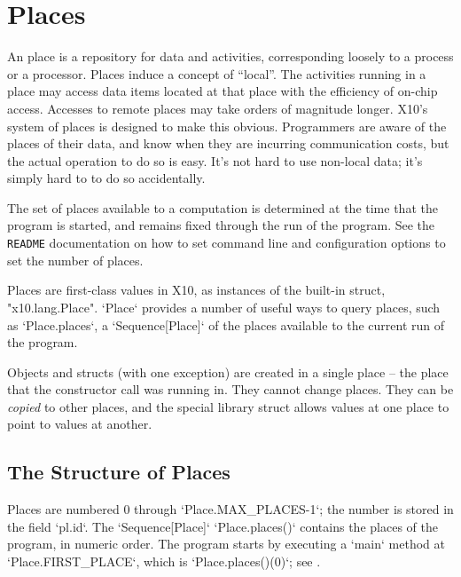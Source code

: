 
\chapter{Places}
\label{XtenPlaces}

An \Xten{} place is a repository for data and activities, corresponding
loosely to a process or a processor. Places induce a concept of ``local''. The
activities running in a place may access data items located at that place with
the efficiency of on-chip access. Accesses to remote places may take orders of
magnitude longer. X10's system of places is designed to make this obvious.
Programmers are aware of the places of their data, and know when they are
incurring communication costs, but the actual operation to do so is easy. It's
not hard to use non-local data; it's simply hard to to do so accidentally.

The set of places available to a computation is determined at the time that
the program is started, and remains fixed through the run of the program. See
the {\tt README} documentation on how to set command line and configuration
options to set the number of places.

Places are first-class values in X10, as instances of the built-in struct,
\xcd"x10.lang.Place".   \xcd`Place` provides a number of useful ways to
query places, such as \xcd`Place.places`, a \xcd`Sequence[Place]` of 
the places
available to the current run of the program.

Objects and structs (with one exception) are created in a single place -- the
place that the constructor call was running in. They cannot change places.
They can be {\em copied} to other places, and the special library struct
 allows values at one place to point to values at another.  

\section{The Structure of Places}

Places are numbered 0 through \xcd`Place.MAX_PLACES-1`; the number is stored
in the field 
\xcd`pl.id`.  The \xcd`Sequence[Place]` \xcd`Place.places()` contains the places of the
program, in numeric order. 
The program starts by executing a \xcd`main` method at
\xcd`Place.FIRST_PLACE`, which is 
\xcd`Place.places()(0)`; see
. 

